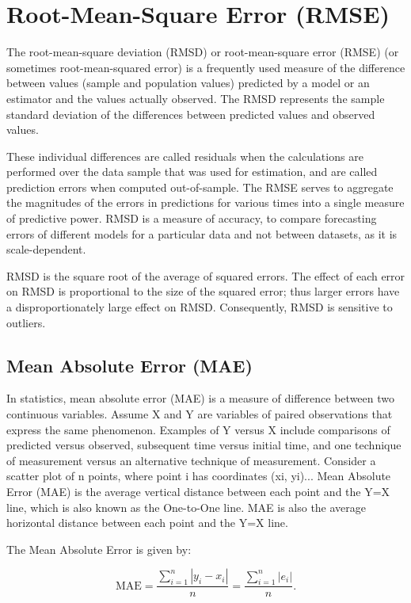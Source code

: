 \documentclass[]{report}
\begin{document}
\section*{Root-Mean-Square Error (RMSE) }
The root-mean-square deviation (RMSD) or root-mean-square error (RMSE) (or sometimes root-mean-squared error) is a frequently used measure of the difference between values (sample and population values) predicted by a model or an estimator and the values actually observed. The RMSD represents the sample standard deviation of the differences between predicted values and observed values. 

These individual differences are called residuals when the calculations are performed over the data sample that was used for estimation, and are called prediction errors when computed out-of-sample. The RMSE serves to aggregate the magnitudes of the errors in predictions for various times into a single measure of predictive power. RMSD is a measure of accuracy, to compare forecasting errors of different models for a particular data and not between datasets, as it is scale-dependent.

RMSD is the square root of the average of squared errors. The effect of each error on RMSD is proportional to the size of the squared error; thus larger errors have a disproportionately large effect on RMSD. Consequently, RMSD is sensitive to outliers.

\subsection*{Mean Absolute Error (MAE)}
In statistics, mean absolute error (MAE) is a measure of difference between two continuous variables. Assume X and Y are variables of paired observations that express the same phenomenon. Examples of Y versus X include comparisons of predicted versus observed, subsequent time versus initial time, and one technique of measurement versus an alternative technique of measurement. Consider a scatter plot of n points, where point i has coordinates (xi, yi)... Mean Absolute Error (MAE) is the average vertical distance between each point and the Y=X line, which is also known as the One-to-One line. MAE is also the average horizontal distance between each point and the Y=X line.

The Mean Absolute Error is given by:

\[{\displaystyle \mathrm {MAE} ={\frac {\sum _{i=1}^{n}\left|y_{i}-x_{i}\right|}{n}}={\frac {\sum _{i=1}^{n}\left|e_{i}\right|}{n}}.}\]
\end{document}
